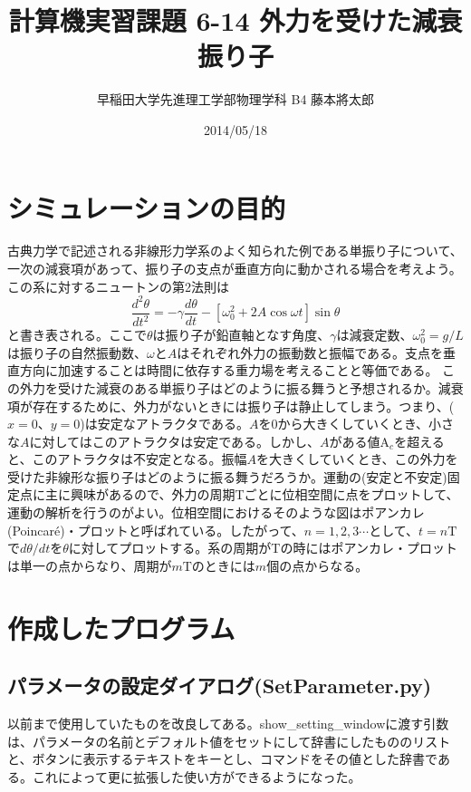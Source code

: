 \documentclass{jsarticle}
\title{計算機実習課題 6-14 外力を受けた減衰振り子}
\author{早稲田大学先進理工学部物理学科 B4 藤本將太郎}
\date{2014/05/18}
\begin{document}
\maketitle
    
    \section{シミュレーションの目的}
        古典力学で記述される非線形力学系のよく知られた例である単振り子について、一次の減衰項があって、振り子の支点が垂直方向に動かされる場合を考えよう。この系に対するニュートンの第2法則は
        \begin{equation}
            \frac{ d^{2}\theta }{ dt^{2} } = -\gamma \frac{ d\theta }{dt}-[\omega_{0}^{2} + 2A \cos \omega t]\sin \theta
            \label{eq:e1}
        \end{equation}
        と書き表される。ここで$\theta$は振り子が鉛直軸となす角度、$\gamma$は減衰定数、$\omega_{0}^{2}=g/L$は振り子の自然振動数、$\omega$と$A$はそれぞれ外力の振動数と振幅である。支点を垂直方向に加速することは時間に依存する重力場を考えることと等価である。
        この外力を受けた減衰のある単振り子はどのように振る舞うと予想されるか。減衰項が存在するために、外力がないときには振り子は静止してしまう。つまり、($x=0$、$y=0$)は安定なアトラクタである。$A$を0から大きくしていくとき、小さな$A$に対してはこのアトラクタは安定である。しかし、$A$がある値$\mathrm{A}_{c}$を超えると、このアトラクタは不安定となる。振幅$A$を大きくしていくとき、この外力を受けた非線形な振り子はどのように振る舞うだろうか。運動の(安定と不安定)固定点に主に興味があるので、外力の周期Tごとに位相空間に点をプロットして、運動の解析を行うのがよい。位相空間におけるそのような図はポアンカレ(Poincar\'{e})・プロットと呼ばれている。したがって、$n=1,2,3\cdots$として、$t=n\mathrm{T}$で$d\theta/ dt$を$\theta$に対してプロットする。系の周期がTの時にはポアンカレ・プロットは単一の点からなり、周期が$m\mathrm{T}$のときには$m$個の点からなる。

    \section{作成したプログラム}
    
        \subsection{パラメータの設定ダイアログ(SetParameter.py)}
            以前まで使用していたものを改良してある。show\_setting\_windowに渡す引数は、パラメータの名前とデフォルト値をセットにして辞書にしたもののリストと、ボタンに表示するテキストをキーとし、コマンドをその値とした辞書である。これによって更に拡張した使い方ができるようになった。
            
\end{document}
